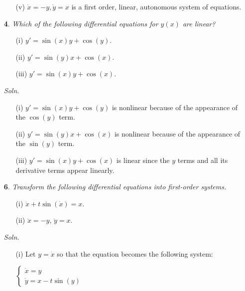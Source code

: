 \documentclass{article}
\begin{document}
\begin{itemize}
\begin{itemize}
        \item[(v)] $\dot{x} = -y, \dot{y} = x$ is a first order, linear, autonomous system of equations.
    \end{itemize}


    \item[\textbf{4}.] \textit{Which of the following differential equations for $y(x)$ are linear?}
    \begin{itemize}
        \item[(i)] $y' = \sin(x)y + \cos(y)$.

        \item[(ii)] $y' = \sin(y)x + \cos(x)$.

        \item[(iii)] $y' = \sin(x)y + \cos(x)$.
    \end{itemize}

    \textit{Soln.}
    \begin{itemize}
        \item[(i)] $y' = \sin(x)y + \cos(y)$ is nonlinear because of the appearance of the $\cos(y)$ term.

        \item[(ii)] $y' = \sin(y)x + \cos(x)$ is nonlinear because of the appearance of the $\sin(y)$ term.

        \item[(iii)] $y' = \sin(x)y + \cos(x)$ is linear since the $y$ terms and all its derivative terms appear linearly.
    \end{itemize}


    \item[\textbf{6}.] \textit{Transform the following differential equations into first-order systems.}
    \begin{itemize}
        \item[(i)] $\ddot{x} + t\sin(\dot{x}) = x$.

        \item[(ii)] $\ddot{x} = -y$, $\ddot{y} = x$.
    \end{itemize}

    \textit{Soln.}
    \begin{itemize}
        \item[(i)] Let $y = \dot{x}$ so that the equation becomes the following system:
        \begin{center}
            $\begin{cases}
                \dot{x} = y\\
                \dot{y} = x - t\sin(y)
            \end{cases}$
        \end{center}
        

\end{itemize}
\end{itemize}
\end{document}
